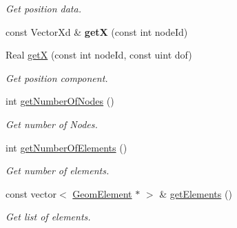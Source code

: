 \begin{DoxyCompactItemize}
\begin{DoxyCompactList}\small\item\em Get position data. \item\end{DoxyCompactList}\item 
\hypertarget{classvoom_1_1_mesh_ae312d18416eb3aad18b386b02b176af8}{
const VectorXd \& {\bfseries getX} (const int nodeId)}
\label{classvoom_1_1_mesh_ae312d18416eb3aad18b386b02b176af8}

\item 
\hypertarget{classvoom_1_1_mesh_a207f6b30add74ee2af1ea99fc2ad6589}{
Real \hyperlink{classvoom_1_1_mesh_a207f6b30add74ee2af1ea99fc2ad6589}{getX} (const int nodeId, const uint dof)}
\label{classvoom_1_1_mesh_a207f6b30add74ee2af1ea99fc2ad6589}

\begin{DoxyCompactList}\small\item\em Get position component. \item\end{DoxyCompactList}\item 
\hypertarget{classvoom_1_1_mesh_aaa003a1d0ebc22f275ab1442384634c0}{
int \hyperlink{classvoom_1_1_mesh_aaa003a1d0ebc22f275ab1442384634c0}{getNumberOfNodes} ()}
\label{classvoom_1_1_mesh_aaa003a1d0ebc22f275ab1442384634c0}

\begin{DoxyCompactList}\small\item\em Get number of Nodes. \item\end{DoxyCompactList}\item 
\hypertarget{classvoom_1_1_mesh_ae6d9ceec1072f438c580b25657ea4423}{
int \hyperlink{classvoom_1_1_mesh_ae6d9ceec1072f438c580b25657ea4423}{getNumberOfElements} ()}
\label{classvoom_1_1_mesh_ae6d9ceec1072f438c580b25657ea4423}

\begin{DoxyCompactList}\small\item\em Get number of elements. \item\end{DoxyCompactList}\item 
\hypertarget{classvoom_1_1_mesh_a80ed078b7dcad577efa215e90029ee44}{
const vector$<$ \hyperlink{classvoom_1_1_geom_element}{GeomElement} $\ast$ $>$ \& \hyperlink{classvoom_1_1_mesh_a80ed078b7dcad577efa215e90029ee44}{getElements} ()}
\label{classvoom_1_1_mesh_a80ed078b7dcad577efa215e90029ee44}

\begin{DoxyCompactList}\small\item\em Get list of elements. \item\end{DoxyCompactList}\end{DoxyCompactItemize}
